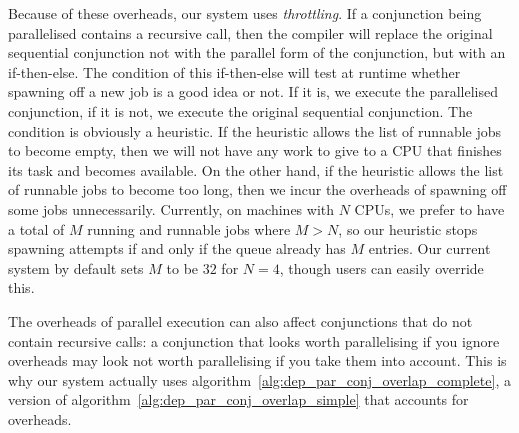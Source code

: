{Because of these overheads, our system uses \emph{throttling}.
If a conjunction being parallelised contains a recursive call,
then the compiler will replace the original sequential conjunction
not with the parallel form of the conjunction,
but with an if-then-else.
The condition of this if-then-else
will test at runtime
whether spawning off a new job is a good idea or not.
If it is, we execute the parallelised conjunction,
if it is not, we execute the original sequential conjunction.
The condition is obviously a heuristic.
If the heuristic allows the list of runnable jobs to become empty,
then we will not have any work to give to a CPU
that finishes its task and becomes available.
On the other hand,
if the heuristic allows the list of runnable jobs to become too long,
then we incur the overheads of spawning off some jobs unnecessarily.
Currently, on machines with $N$ CPUs,
we prefer to have a total of $M$ running and runnable jobs where $M > N$,
so our heuristic stops spawning attempts
if and only if the queue already has $M$ entries.
Our current system by default sets $M$ to be $32$ for $N = 4$,
though users can easily override this.

The overheads of parallel execution can also affect conjunctions
that do not contain recursive calls:
a conjunction that looks worth parallelising if you ignore overheads
may look not worth parallelising if you take them into account.
This is why our system actually uses
algorithm~\ref{alg:dep_par_conj_overlap_complete},
a version of algorithm~\ref{alg:dep_par_conj_overlap_simple}
that accounts for overheads.

}

